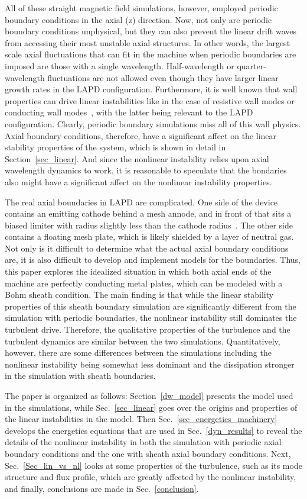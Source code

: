 \documentclass[showpacs,preprintnumbers,amsmath,amssymb,superscriptaddress,aip]{revtex4-1}
\begin{document}
All of these straight magnetic field simulations, however, employed periodic boundary conditions in the axial (z) direction. 
Now, not only are periodic boundary conditions unphysical, but they can also prevent the linear drift waves from accessing their most unstable axial structures.
In other words, the largest scale axial fluctuations that can fit in the machine when periodic boundaries are imposed are those with a single wavelength. 
Half-wavelength or quarter-wavelength fluctuations
are not allowed even though they have larger linear growth rates in the LAPD configuration. Furthermore, it is well known that wall properties can drive linear instabilities like in
the case of resistive wall modes or conducting wall modes~\cite{berk1991}, with the latter being relevant to the LAPD configuration. Clearly, periodic boundary simulations miss all of this wall physics.
Axial boundary conditions, therefore, have a significant
affect on the linear stability properties of the system, which is shown in detail in Section~\ref{sec_linear}. And since the nonlinear instability relies upon axial wavelength dynamics to work, it is 
reasonable to speculate that the bondaries also might have a significant affect on the nonlinear instability properties.

The real axial boundaries in LAPD are complicated. One side of the device contains an emitting cathode behind a mesh annode, and in front of that sits a biased limiter with radius slightly
less than the cathode radius~\cite{schaffner2012}.
The other side contains a floating mesh plate, which is likely shielded by a layer of neutral gas. Not only is it difficult to determine what the actual axial boundary conditions are, it is also
difficult to develop and implement models for the boundaries. Thus, this paper explores the idealized situation in which both axial ends of the machine are
perfectly conducting metal plates, which can be modeled with a Bohm sheath condition. The main finding is that while the linear stability properties of this sheath boundary simulation are significantly 
different from the simulation with periodic boundaries, the nonlinear instability still dominates the turbulent drive. Therefore, the qualitative properties of the turbulence and the turbulent
dynamics are similar between the two simulations. Quantitatively, however, there are some differences between the simulations
including the nonlinear instability being somewhat less dominant and the dissipation stronger in the simulation with sheath boundaries.

The paper is organized as follows: Section~\ref{dw_model} presents the model used in the simulations, while 
Sec.~\ref{sec_linear} goes over the origins and properties of the linear instabilities in the model.
Then Sec.~\ref{sec_energetics_machinery} develops the energetics equations that are used in Sec.~\ref{dyn_results} to reveal the details of the nonlinear instability in both the simulation
with periodic axial boundary conditions and the one with sheath axial boundary conditions. Next, Sec.~\ref{Sec_lin_vs_nl} looks at some properties of the turbulence, such as its mode structure
and flux profile, which are greatly affected by the nonlinear instability, and finally, conclusions are made in Sec.~\ref{conclusion}.
\end{document}
